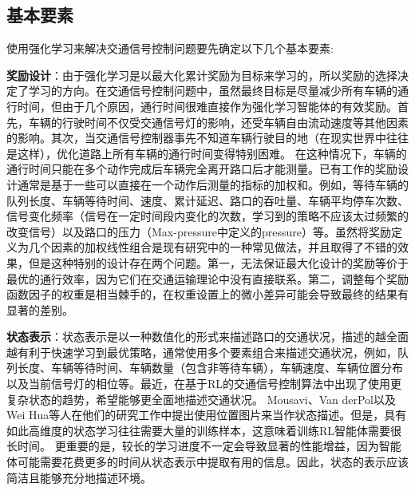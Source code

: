 



\subsection{基本要素}
使用强化学习来解决交通信号控制问题要先确定以下几个基本要素:

\textbf{奖励设计}：由于强化学习是以最大化累计奖励为目标来学习的，所以奖励的选择决定了学习的方向。在交通信号控制问题中，虽然最终目标是尽量减少所有车辆的通行时间，但由于几个原因，通行时间很难直接作为强化学习智能体的有效奖励。首先，车辆的行驶时间不仅受交通信号灯的影响，还受车辆自由流动速度等其他因素的影响。其次，当交通信号控制器事先不知道车辆行驶目的地（在现实世界中往往是这样），优化道路上所有车辆的通行时间变得特别困难。 在这种情况下，车辆的通行时间只能在多个动作完成后车辆完全离开路口后才能测量。已有工作的奖励设计通常是基于一些可以直接在一个动作后测量的指标的加权和。例如，等待车辆的队列长度、车辆等待时间、速度、累计延迟、路口的吞吐量、车辆平均停车次数、信号变化频率（信号在一定时间段内变化的次数，学习到的策略不应该太过频繁的改变信号）以及路口的压力（Max-pressure中定义的pressure）等。虽然将奖励定义为几个因素的加权线性组合是现有研究中的一种常见做法，并且取得了不错的效果，但是这种特别的设计存在两个问题。第一，无法保证最大化设计的奖励等价于最优的通行效率，因为它们在交通运输理论中没有直接联系。第二，调整每个奖励函数因子的权重是相当棘手的，在权重设置上的微小差异可能会导致最终的结果有显著的差别。

\textbf{状态表示}：状态表示是以一种数值化的形式来描述路口的交通状况，描述的越全面越有利于快速学习到最优策略，通常使用多个要素组合来描述交通状况，例如，队列长度、车辆等待时间、车辆数量（包含非等待车辆），车辆速度、车辆位置分布以及当前信号灯的相位等。最近，在基于RL的交通信号控制算法中出现了使用更复杂状态的趋势，希望能够更全面地描述交通状况。 Mousavi、Van derPol以及Wei Hua等人在他们的研究工作中提出使用位置图片来当作状态描述。但是，具有如此高维度的状态学习往往需要大量的训练样本，这意味着训练RL智能体需要很长时间。 更重要的是，较长的学习进度不一定会导致显著的性能增益，因为智能体可能需要花费更多的时间从状态表示中提取有用的信息。因此，状态的表示应该简洁且能够充分地描述环境。

